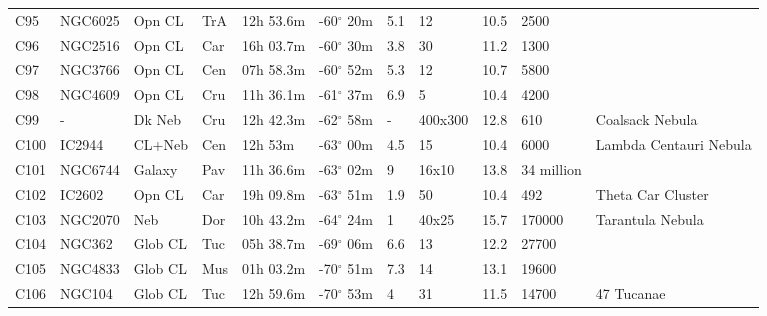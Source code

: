 \begin{longtable}{@{}lllllllllll@{}}
C95        & NGC6025     & Opn CL     & TrA       & 12h 53.6m & -60$^{\circ}$ 20m  & 5.1       & 12                   & 10.5     & 2500                &                                 \\
C96        & NGC2516     & Opn CL     & Car       & 16h 03.7m & -60$^{\circ}$ 30m  & 3.8       & 30                   & 11.2     & 1300                &                                 \\
C97        & NGC3766     & Opn CL     & Cen       & 07h 58.3m & -60$^{\circ}$ 52m  & 5.3       & 12                   & 10.7     & 5800                &                                 \\
C98        & NGC4609     & Opn CL     & Cru       & 11h 36.1m & -61$^{\circ}$ 37m  & 6.9       & 5                    & 10.4     & 4200                &                                 \\
C99        & -           & Dk Neb     & Cru       & 12h 42.3m & -62$^{\circ}$ 58m  & -         & 400x300              & 12.8     & 610                 & Coalsack Nebula                 \\
C100       & IC2944      & CL+Neb     & Cen       & 12h 53m   & -63$^{\circ}$ 00m  & 4.5       & 15                   & 10.4     & 6000                & Lambda Centauri Nebula          \\
C101       & NGC6744     & Galaxy     & Pav       & 11h 36.6m & -63$^{\circ}$ 02m  & 9         & 16x10                & 13.8     & 34 million          &                                 \\
C102       & IC2602      & Opn CL     & Car       & 19h 09.8m & -63$^{\circ}$ 51m  & 1.9       & 50                   & 10.4     & 492                 & Theta Car Cluster               \\
C103       & NGC2070     & Neb        & Dor       & 10h 43.2m & -64$^{\circ}$ 24m  & 1         & 40x25                & 15.7     & 170000              & Tarantula Nebula                \\
C104       & NGC362      & Glob CL    & Tuc       & 05h 38.7m & -69$^{\circ}$ 06m  & 6.6       & 13                   & 12.2     & 27700               &                                 \\
C105       & NGC4833     & Glob CL    & Mus       & 01h 03.2m & -70$^{\circ}$ 51m  & 7.3       & 14                   & 13.1     & 19600               &                                 \\
C106       & NGC104      & Glob CL    & Tuc       & 12h 59.6m & -70$^{\circ}$ 53m  & 4         & 31                   & 11.5     & 14700               & 47 Tucanae                      \\

\end{longtable}
